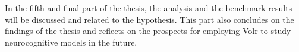 \documentclass[report.tex]{subfiles}
\begin{document}
In the fifth and final part of the thesis, the analysis and the benchmark
results will be discussed and related to the hypothesis.
This part also concludes on the findings of the thesis and
reflects on the prospects for employing Volr to study neurocognitive
models in the future.

\end{document}

